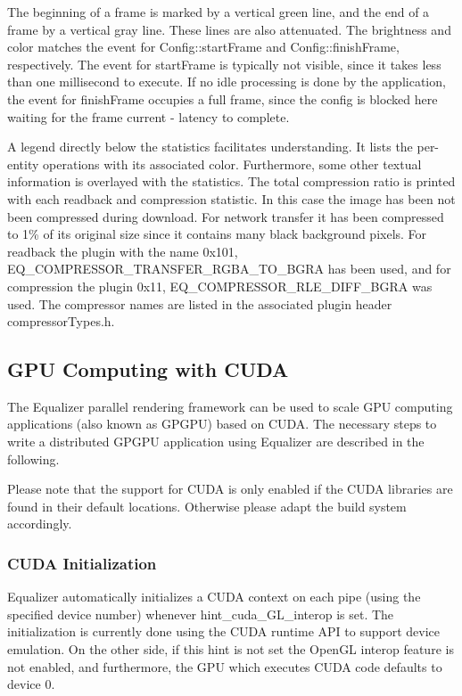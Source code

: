 \documentclass[10pt,a4]{scrartcl}
\begin{document}
The beginning of a frame is marked by a vertical green line, and the end of a
frame by a vertical gray line. These lines are also attenuated. The brightness
and color matches the event for \textsf{Config::startFrame} and
\textsf{Config::finishFrame}, respectively. The event for \textsf{startFrame} is
typically not visible, since it takes less than one millisecond to execute. If
no idle processing is done by the application, the event for
\textsf{finishFrame} occupies a full frame, since the config is blocked here
waiting for the frame \textsf{current - latency} to complete.

A legend directly below the statistics facilitates understanding. It lists the
per-entity operations with its associated color. Furthermore, some other textual
information is overlayed with the statistics. The total compression ratio is
printed with each readback and compression statistic. In this case the image has
been not been compressed during download. For network transfer it has been
compressed to 1\% of its original size since it contains many black background
pixels. For readback the plugin with the name \textsf{0x101,
  EQ\_COMPRESSOR\_TRANS\-FER\_RGBA\_TO\_BGRA} has been used, and for compression
the plugin \textsf{0x11, EQ\_COM\-PRESSOR\_RLE\_DIFF\_BGRA} was used. The
compressor names are listed in the associated plugin header
\textsf{compressorTypes.h}.

\subsection{\label{sCUDA}GPU Computing with CUDA}

The Equalizer parallel rendering framework can be used to scale GPU 
computing applications (also known as GPGPU) based on CUDA. The necessary
steps to write a distributed GPGPU application using Equalizer are described
in the following.

Please note that the support for CUDA is only enabled if the CUDA libraries are
found in their default locations. Otherwise please adapt the build system
accordingly.

\subsubsection{CUDA Initialization}

Equalizer automatically initializes a CUDA context on each pipe (using the
specified device number) whenever \textsf{hint\_cuda\_GL\_interop} is set. The
initialization is currently done using the CUDA runtime API to support device
emulation. On the other side, if this hint is not set the OpenGL interop feature
is not enabled, and furthermore, the GPU which executes CUDA code defaults to
device 0.
\end{document}
